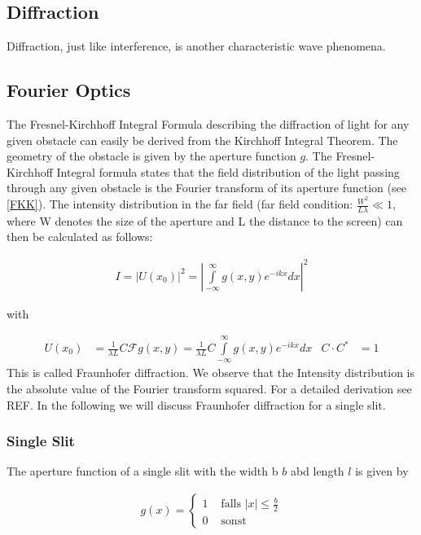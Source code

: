 \subsection{Diffraction}

Diffraction, just like interference, is another characteristic wave phenomena.

\subsection{Fourier Optics}

The Fresnel-Kirchhoff Integral Formula describing the diffraction of light for any given obstacle can easily be derived from the Kirchhoff Integral Theorem. The geometry of the obstacle is given by the aperture function $g$. The Fresnel-Kirchhoff Integral formula states that the field distribution of the light passing through any given obstacle is the Fourier transform of its aperture function (see \ref{FKK}). The intensity distribution in the far field (far field condition: $\frac{W^2}{L\lambda} \ll 1$, where W denotes the size of the aperture and L the distance to the screen) can then be calculated as follows:


\begin{align}
I=|U(x_0)|^2=\left| \int\limits_{-\infty}^{\infty} g(x,y)e^{-ikx}dx \right|^2
\end{align}

with 

\begin{align}
  U(x_0) &= \frac{1}{\lambda L} C \mathscr{F}{g(x, y)}    = \frac{1}{\lambda L} C   \int\limits_{-\infty}^{\infty}  g(x,y)e^{-ikx}dx    &  C  \cdot C^* &= 1                         \label{FKK}
\end{align}
This is called Fraunhofer diffraction. We observe that the Intensity distribution is the absolute value of the Fourier transform squared. For a detailed derivation see REF.
In the following we will discuss Fraunhofer diffraction for a single slit.

\subsubsection{Single Slit}

The aperture function of a single slit with the width b $b$ abd length $l$ is given by

\begin{align}
g(x)=\begin{cases}1 &\mbox{ falls }|x|\leq\frac{b}{2}\\0 &\mbox{ sonst }\end{cases}
\end{align}

